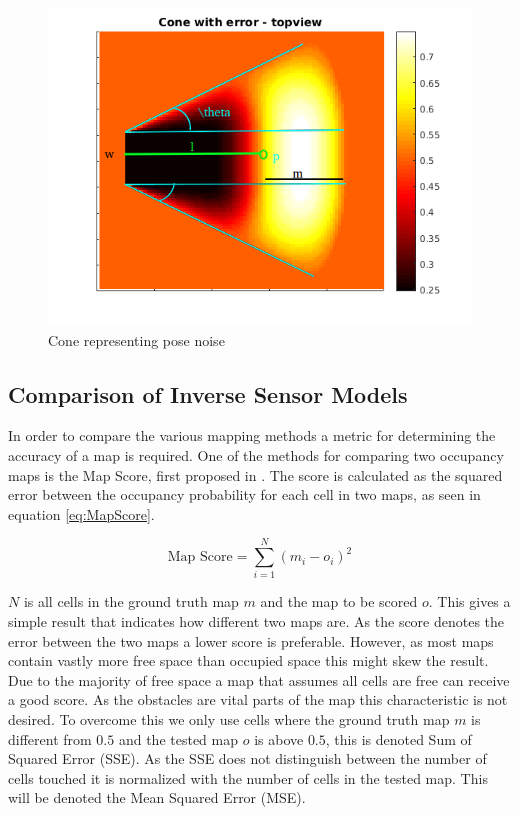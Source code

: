 \begin{figure}[htbp]
	\centering
	\includegraphics[width=\textwidth]{figures/static_mapping/cone_noise_top}
	\caption{Cone representing pose noise }
	\label{fig:cone_with_noise_top}
\end{figure}



\subsection{Comparison of Inverse Sensor Models}
In order to compare the various mapping methods a metric for determining the accuracy of a map is required. One of the methods for comparing two occupancy maps is the Map Score, first proposed in \cite{MoravecMartin}. The score is calculated as the squared error between the occupancy probability for each cell in two maps, as seen in equation \ref{eq:MapScore}.

\begin{equation}
\label{eq:MapScore}
\text{Map Score} = \sum_{i=1}^{N} (m_{i} - o_{i})^2
\end{equation}

$N$ is all cells in the ground truth map $m$ and the map to be scored $o$. 
This gives a simple result that indicates how different two maps are. As the score denotes the error between the two maps a lower score is preferable.  
However, as most maps contain vastly more free space than occupied space this might skew the result. 
Due to the majority of free space a map that assumes all cells are free can receive a  good score.
As the obstacles are vital parts of the map this characteristic is not desired. 
To overcome this we only use cells where the ground truth map $m$ is different from \(0.5\) and the tested map $o$ is above \(0.5\), this is denoted Sum of Squared Error (SSE).
As the SSE does not distinguish between the number of cells touched it is normalized with the number of cells in the tested map. This will be denoted the Mean Squared Error (MSE).  

